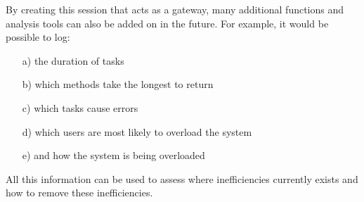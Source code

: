 By creating this session that acts as a gateway, many additional functions and analysis tools can also be added on in the future.  For example, it would be possible to log:
\begin{enumerate}
	\item[a)] the duration of tasks
	\item[b)] which methods take the longest to return
	\item[c)] which tasks cause errors
	\item[d)] which users are most likely to overload the system
	\item[e)] and how the system is being overloaded
\end{enumerate}
All this information can be used to assess where inefficiencies currently exists and how to remove these inefficiencies.\newline

